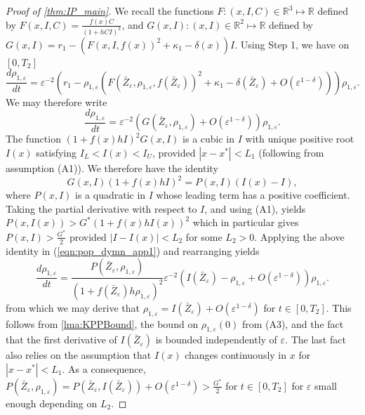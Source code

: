 \documentclass[]{article}
\theoremstyle{remark}
\begin{document}
\begin{proof}[{Proof of \cref{thm:IP_main}}]
We recall the functions  $F:(x,I,C)\in\mathbb{R}^3\mapsto{}\mathbb{R}$ defined by $F(x,I,C)=\frac{f(x)C}{(1+hCI)^2}$, and $G(x,I): (x,I)\in\mathbb{R} ^2\mapsto\mathbb{R}$ defined by $G(x,I)=r_1-(F(x,I,f(x))^2+\kappa_1-\delta(x))I$. Using Step 1, we have on $[0,T_2]$
\begin{equation*}
\frac{d\rho_{1,\varepsilon}}{dt}=\varepsilon^{-2}\left(r_1-\rho_{1,\varepsilon}(F(\bar{Z}_\varepsilon,\rho_{1,\varepsilon},f(\bar{Z}_\varepsilon))^2+\kappa_1-\delta(\bar{Z}_\varepsilon)+O(\varepsilon^{1-\delta}))\right)\rho_{1,\varepsilon}.  
\end{equation*}
 We may therefore write
\begin{equation}\label{eqn:pop_dymn_app1}
\frac{d\rho_{1,\varepsilon}}{dt}=\varepsilon^{-2}(G(\bar{Z}_\varepsilon,\rho_{1,\varepsilon})+O(\varepsilon^{1-\delta}))\rho_{1,\varepsilon}.
\end{equation}
The function $(1+f(x)hI)^2G(x,I)$ is a cubic in $I$ with unique positive root $I(x)$ satisfying $I_L<I(x)<I_U$, provided $|x-x^{*}|<L_1$ (following from assumption (A1)). We therefore have the identity
\[G(x,I)(1+f(x)hI)^2=P(x,I)(I(x)-I),\] where $P(x,I)$ is a quadratic in $I$ whose leading term has a positive coefficient. Taking the partial derivative with respect to $I$, and using (A1), yields
$P(x,I(x))>G^{*}(1+f(x)hI(x))^2$ which in particular gives $P(x,I)>\frac{G^{*}}{2}$ provided $|I-I(x)|<L_2$ for some $L_2>0$. Applying the above identity in (\ref{eqn:pop_dymn_app1}) and rearranging yields
\begin{equation}\label{eqn:pop_dymn_app12}
\frac{d\rho_{1,\varepsilon}}{dt}=\frac{P(\bar{Z}_\varepsilon,\rho_{1,\varepsilon})}{(1+f(\bar{Z}_\varepsilon)h\rho_{1,\varepsilon})^2}\varepsilon^{-2}(I(\bar{Z}_\varepsilon)-\rho_{1,\varepsilon}+O(\varepsilon^{1-\delta}))\rho_{1,\varepsilon}.
\end{equation}
from which we may derive that $\rho_{1,\varepsilon}=I(\bar{Z}_\varepsilon)+O(\varepsilon^{1-\delta})$ for $t\in[0,T_2]$. 
This follows from \cref{lma:KPPBound}, the bound on $\rho_{1,\varepsilon}(0)$ from (A3), and the fact that the first derivative of $I(\bar{Z}_\varepsilon)$ is bounded independently of $\varepsilon$. The last fact also relies on the assumption that $I(x)$ changes continuously in $x$ for $|x-x^{*}|<L_1$. As a consequence, $P(\bar{Z}_\varepsilon,\rho_{1,\varepsilon})=P(\bar{Z}_\varepsilon,I(\bar{Z}_\varepsilon))+O(\varepsilon^{1-\delta})>\frac{G^{*}}{2}$ for $t\in[0,T_2]$ for $\varepsilon$ small enough depending on $L_2$.


\end{proof}
\end{document}
